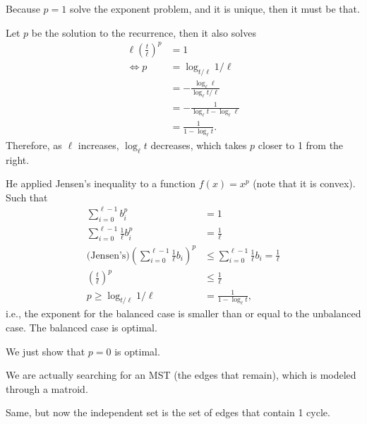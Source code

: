  


Because $p=1$ solve the exponent problem, and it is unique, then it must be that.


Let $p$ be the solution to the recurrence, then it also solves
\begin{align*}
    \ell \left( \frac{t}{\ell} \right)^{p} &= 1 \\
    \iff p &= \log_{t / \ell} 1 / \ell \\
    &= - \frac{\log_\ell \ell}{\log_\ell t / \ell} \\
    &= - \frac{1}{\log_\ell t - \log_\ell \ell} \\
    &= \frac{1}{1 - \log_\ell t}
.\end{align*}
Therefore, as $\ell$ increases, $\log_\ell t$ decreases, which takes $p$ closer to 1 from the right.


He applied Jensen's inequality to a function $f(x) = x^{p}$ (note that it is convex).
Such that 
\begin{align*}
    \sum_{i=0}^{\ell-1} b_i^{p} &= 1 \\
    \sum_{i=0}^{\ell-1} \frac{1}{\ell} b_i^{p} &= \frac{1}{\ell} \\
    \text{(Jensen's)} \left( \sum_{i=0}^{\ell-1} \frac{1}{\ell} b_i \right)^{p} &\le \sum_{i=0}^{\ell-1} \frac{1}{\ell} b_i = \frac{1}{\ell} \\
    \left( \frac{t}{\ell} \right)^{p} &\le \frac{1}{\ell} \\
    p \ge \log_{t / \ell} 1 / \ell &= \frac{1}{1 - \log_\ell t}
,\end{align*}
i.e., the exponent for the balanced case is smaller than or equal to the unbalanced case. 
The balanced case is optimal.


We just show that $p=0$ is optimal.



We are actually searching for an MST (the edges that remain), which is modeled through a matroid.


Same, but now the independent set is the set of edges that contain 1 cycle.


